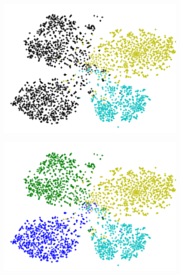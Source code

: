 \begin{figure}[t]
  \centering
  \begin{subfigure}[b]{0.38\linewidth}
    \includegraphics[width=\linewidth]{images/none}
    \caption{}
    \label{fig:null}
  \end{subfigure}
%
  \begin{subfigure}[b]{0.38\linewidth}
    \includegraphics[width=\linewidth]{images/truth}
    \caption{}
    \label{fig:truth}
  \end{subfigure}
%
  \begin{subfigure}[b]{0.38\linewidth}

\end{subfigure}
\end{figure}
